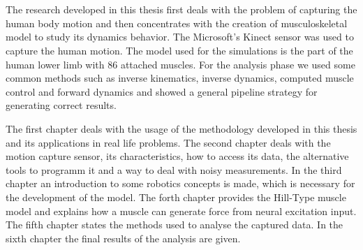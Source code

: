 \section*{\texorpdfstring{}{}}

\en
The research developed in this thesis first deals with the problem of capturing the human body motion and then concentrates with the creation of musculoskeletal model to study its dynamics behavior. The Microsoft's Kinect sensor was used to capture the human motion. The model used for the simulations is the part of the human lower limb with 86 attached muscles. For the analysis phase we used some common methods such as inverse kinematics, inverse dynamics, computed muscle control and forward dynamics and showed a general pipeline strategy for generating correct results.

The first chapter deals with the usage of the methodology developed in this thesis and its applications in real life problems. The second chapter deals with the motion capture sensor, its characteristics, how to access its data, the alternative tools to programm it and a way to deal with noisy measurements. In the third chapter an introduction to some robotics concepts is made, which is necessary for the development of the model. The forth chapter provides the Hill-Type muscle model and explains how a muscle can generate force from neural excitation input. The fifth chapter states the methods used to analyse the captured data. In the sixth chapter the final results of the analysis are given.
\gr


\paragraph{\textbf{}}

\thispagestyle{empty}
\clearpage\mbox{}
\thispagestyle{empty} 